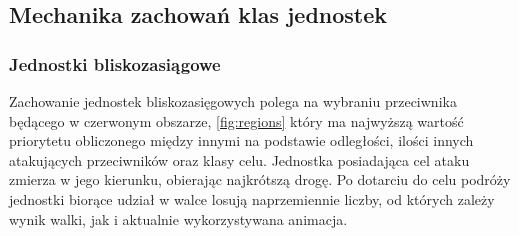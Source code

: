 \subsection{Mechanika zachowań klas jednostek}
\subsubsection{Jednostki bliskozasiągowe}
Zachowanie jednostek bliskozasięgowych polega na wybraniu przeciwnika będącego w czerwonym obszarze, \ref{fig:regions} który ma najwyższą
wartość priorytetu obliczonego między innymi na podstawie odległości, ilości innych atakujących przeciwników oraz klasy celu.
Jednostka posiadająca cel ataku zmierza w jego kierunku, obierając najkrótszą drogę. Po dotarciu do celu podróży jednostki biorące udział w walce
losują naprzemiennie liczby, od których zależy wynik walki, jak i aktualnie wykorzystywana animacja.

